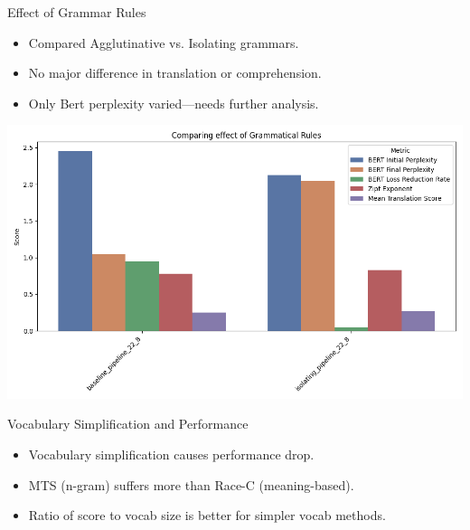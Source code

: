\documentclass{beamer}
\begin{document}
\begin{frame}{Effect of Grammar Rules}
	\begin{itemize}
		\item Compared Agglutinative vs. Isolating grammars.
		\item No major difference in translation or comprehension.
		\item Only Bert perplexity varied—needs further analysis.
	\end{itemize}
	\includegraphics[width=0.7\linewidth]{figures/results/1_effect_of_grammar.png}
\end{frame}

\begin{frame}{Vocabulary Simplification and Performance}
	\begin{itemize}
		\item Vocabulary simplification causes performance drop.
		\item MTS (n-gram) suffers more than Race-C (meaning-based).
		\item Ratio of score to vocab size is better for simpler vocab methods.
	\end{itemize}
\end{frame}
\end{document}

